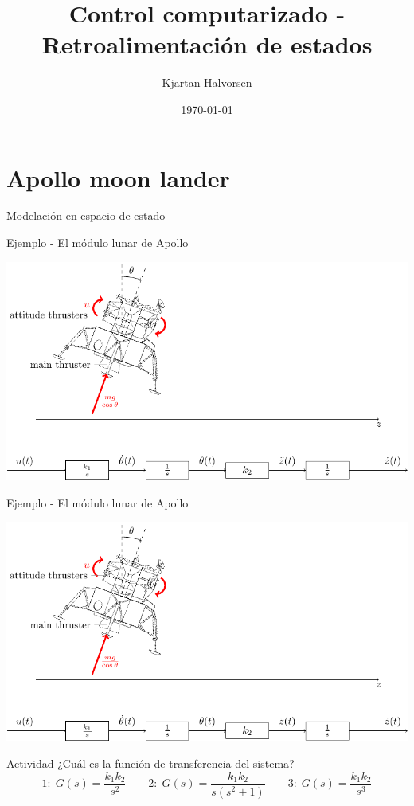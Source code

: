 \documentclass[presentation,aspectratio=1610]{beamer}
\author{Kjartan Halvorsen}
\date{\today}
\title{Control computarizado - Retroalimentación de estados}
\begin{document}
\maketitle

\section{Apollo moon lander}
\label{sec:org52c5fc5}
\begin{frame}[label={sec:org15091bf}]{Modelación en espacio de estado}
\end{frame}
\begin{frame}[label={sec:org21d661e}]{Ejemplo - El módulo lunar de Apollo}
\begin{center}
\includegraphics[width=\linewidth]{fig-apollo}
\end{center}
\end{frame}
\begin{frame}[label={sec:orgf46085a}]{Ejemplo - El módulo lunar de Apollo}
\begin{center}
\includegraphics[width=0.8\linewidth]{fig-apollo}
\end{center}
\alert{Actividad} ¿Cuál es la función de transferencia del sistema?
\[1: \; G(s) = \frac{k_1 k_2}{s^2}\qquad 2: \; G(s) = \frac{k_1 k_2}{s(s^2 + 1)} \qquad 3: \; G(s) = \frac{k_1 k_2}{s^3}\]
\end{frame}
\end{document}
